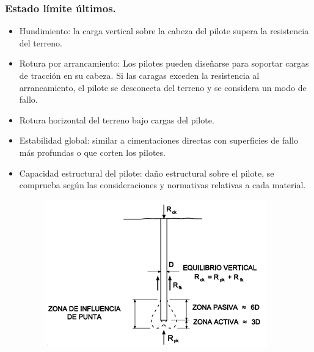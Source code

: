 \subsubsection{Estado límite últimos.}
\begin{itemize}
    \item Hundimiento: la carga vertical sobre la cabeza del pilote supera la resistencia del terreno.
    \item Rotura por arrancamiento: Los pilotes pueden diseñarse para soportar cargas de tracción en su cabeza. Si las caragas exceden la resistencia al arrancamiento, el pilote se desconecta del terreno y se considera un modo de fallo.
    \item Rotura horizontal del terreno bajo cargas del pilote.
    \item Estabilidad global: similar a cimentaciones directas con superficies de fallo más profundas o que corten los pilotes.
    \item Capacidad estructural del pilote: daño estructural sobre el pilote, se comprueba según las consideraciones y normativas relativas a cada material.
    
    \begin{figure}[H]
        \centering
        \includegraphics[width = 0.75 \linewidth]{Imagenes/Cimentaciones profundas - estado limite ultimos.png}
    \end{figure}


\end{itemize}

